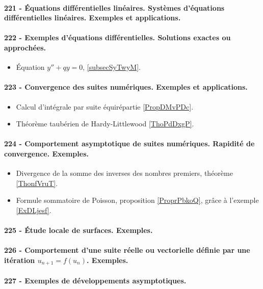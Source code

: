 \paragraph{221 - Équations différentielles linéaires. Systèmes d’équations différentielles linéaires. Exemples et applications.}
\paragraph{222 - Exemples d’équations différentielles. Solutions exactes ou approchées.}
\begin{itemize}
    \item Équation \( y''+qy=0\), \ref{subsecSyTwyM}.
\end{itemize}
\paragraph{223 - Convergence des suites numériques. Exemples et applications.}
\begin{itemize}
    \item Calcul d'intégrale par suite équirépartie \ref{PropDMvPDc}.
    \item Théorème taubérien de Hardy-Littlewood \ref{ThoPdDxgP}.
\end{itemize}
\paragraph{224 - Comportement asymptotique de suites numériques. Rapidité de convergence. Exemples.}
\begin{itemize}
    \item Divergence de la somme des inverses des nombres premiers, théorème \ref{ThonfVruT}.
    \item Formule sommatoire de Poisson, proposition \ref{ProprPbkoQ}, grâce à l'exemple \ref{ExDLjesf}.
\end{itemize}
\paragraph{225 - Étude locale de surfaces. Exemples.}
\paragraph{226 - Comportement d’une suite réelle ou vectorielle définie par une itération \( u_{n+1}=f(u_n)\). Exemples.}
\paragraph{227 - Exemples de développements asymptotiques.}

